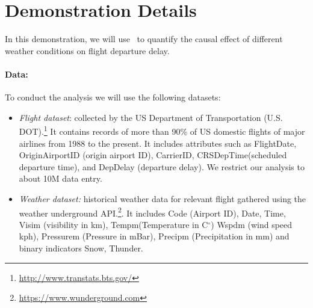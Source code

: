 \section{Demonstration Details}
\label{sec:dd}
 In this demonstration, we will use \GSQL\ to quantify the causal effect of
 different weather conditions on flight departure delay. 
    \paragraph{\bf Data:} To conduct the analysis we will use the following datasets: 
 \begin{itemize}
   \item {\it Flight dataset}: collected by the US
Department of Transportation (U.S. DOT).\footnote{\url{http://www.transtats.bts.gov/}} It contains
records of more than 90\% of US domestic flights of major airlines
from 1988 to the present. It includes attributes such as FlightDate, OriginAirportID (origin airport ID), CarrierID, CRSDepTime(scheduled departure time), and DepDelay (departure delay). We restrict our analysis to about 10M data entry.
   \item {\it Weather dataset:} historical weather data for relevant flight gathered using the weather underground API.\footnote{\url{https://www.wunderground.com}}. It includes Code (Airport ID),
Date, Time,  Visim (visibility in km),
  Tempm(Temperature in C$^{\circ}$)
  Wspdm (wind speed kph), Pressurem (Pressure in mBar), Precipm  (Precipitation in mm)  and binary indicators Snow, Thunder.
 \end{itemize}
  

 



